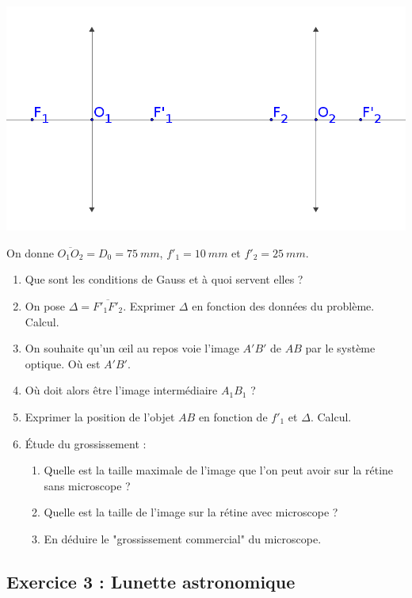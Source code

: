 \begin{minipage}[c]{\linewidth/2}
	\includegraphics[width=\textwidth]{./Images/mpsi_s05_ex02.png}
\end{minipage}%
\begin{minipage}[c]{\linewidth/2}
	On donne $\overline{O_1O_2} = D_0 = \SI{75}{mm}$, $f'_1 = \SI{10}{mm}$ et $f'_2 = \SI{25}{mm}$.
\end{minipage}

\begin{enumerate}
	\item Que sont les conditions de Gauss et à quoi servent elles ?
	\item On pose $\Delta = \overline{F'_1F'_2}$. Exprimer $\Delta$ en fonction des données du problème. Calcul.
	\item On souhaite qu'un œil au repos voie l'image $A'B'$ de $AB$ par le système optique. Où est $A'B'$.
	\item Où doit alors être l'image intermédiaire $A_1B_1$ ?
	\item Exprimer la position de l'objet $AB$ en fonction de $f'_1$ et $\Delta$. Calcul.
	\item Étude du grossissement :
	\begin{enumerate}
		\item Quelle est la taille maximale de l'image que l'on peut avoir sur la rétine sans microscope ?
		\item Quelle est la taille de l'image sur la rétine avec microscope ?
		\item En déduire le "grossissement commercial" du microscope.
	\end{enumerate}
\end{enumerate}

\subsection{Exercice 3 : Lunette astronomique}

